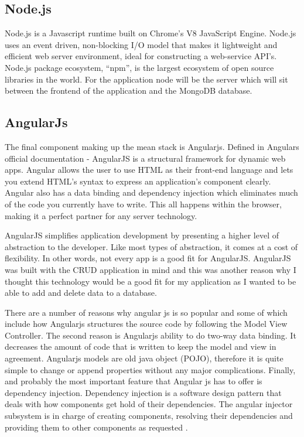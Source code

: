 \subsection{Node.js}

Node.js is a Javascript runtime built on Chrome’s V8 JavaScript Engine.
Node.js uses an event driven, non-blocking I/O model that makes it lightweight
and efficient web server environment, ideal for constructing a web-service
API’s. Node.js package ecosystem, “npm”, is the largest ecosystem of open
source libraries in the world. For the application node will be the server which will sit between the frontend of the application and the MongoDB database.\cite{nodejs}

\subsection{AngularJs}
The final component making up the mean stack is Angularjs. Defined in Angulars official documentation\cite{angularjs} - AngularJS is a structural framework for dynamic
web apps. Angular allows the user to use HTML as their front-end language and lets you extend HTML’s syntax to express an application’s component clearly. Angular also has a data binding and dependency injection which eliminates much
of the code you currently have to write. This all happens within the
browser, making it a perfect partner for any server technology.

AngularJS simplifies application development by presenting a higher level of abstraction to the developer. Like most types of abstraction, it comes at a cost of flexibility. In other words, not every app is a good fit for AngularJS. AngularJS was built with the CRUD application in mind and this was another reason why I thought this technology would be a good fit for my application as I wanted to be able to add and delete data to a database. \cite{angularjsa}
 
There are a number of reasons why angular js is so popular and some of which include how Angularjs structures the source code by following
the Model View Controller. The second reason is  Angularjs ability to do two-way data binding. It decreases the amount of code
that is written to keep the model and view in agreement.  Angularjs
models are old java object (POJO), therefore it is quite simple to change or
append properties without any major complications. Finally, and probably the most important
feature that Angular js has to offer is dependency injection. Dependency injection
is a software design pattern that deals with how components get hold of
their dependencies. The angular injector subsystem is in charge of creating components, resolving their dependencies and providing them to other
components as requested \cite{angularjsfeat}.

